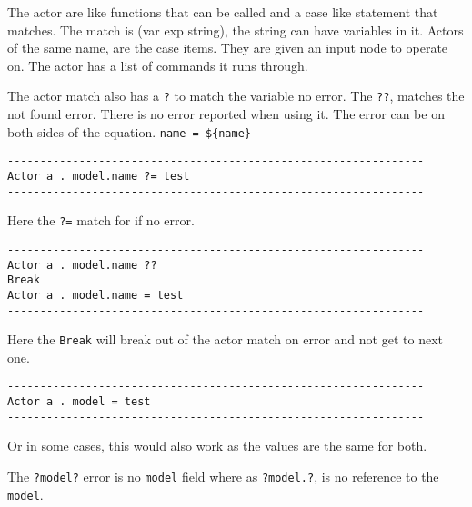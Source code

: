 The actor are like functions that can be called and a case like
statement that matches. The match is (var exp string), the string can
have variables in it. Actors of the same name, are the case items. They
are given an input node to operate on. The actor has a list of commands
it runs through.

The actor match also has a \texttt{?} to match the variable no error.
The \texttt{??}, matches the not found error. There is no error reported
when using it. The error can be on both sides of the equation.
\texttt{name\ =\ \$\{name\}}

\begin{verbatim}
----------------------------------------------------------------
Actor a . model.name ?= test
----------------------------------------------------------------
\end{verbatim}

Here the \texttt{?=} match for if no error.

\begin{verbatim}
----------------------------------------------------------------
Actor a . model.name ??
Break
Actor a . model.name = test
----------------------------------------------------------------
\end{verbatim}

Here the \texttt{Break} will break out of the actor match on error and
not get to next one.

\begin{verbatim}
----------------------------------------------------------------
Actor a . model = test
----------------------------------------------------------------
\end{verbatim}

Or in some cases, this would also work as the values are the same for
both.

The \texttt{?model?} error is no \texttt{model} field where as
\texttt{?model.?}, is no reference to the \texttt{model}.
